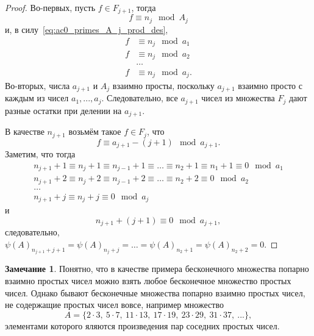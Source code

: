 \documentclass[a4paper,openbib]{article}
\theoremstyle{definition}
\newtheorem{remark}[lemma]{Замечание}
\begin{document}
\begin{proof}
	Во-первых, пусть $f \in F_{j+1}$,
	тогда
	\begin{equation}
		f \equiv n_j \mod A_j
	\end{equation}
	и, в силу~\eqref{eq:ac0_primes_A_j_prod_des},
	\begin{equation}
		\begin{array}{rl}
		f &\equiv n_j \mod a_1
		\\
		f &\equiv n_j \mod a_2
		\\
		&\dots
		\\
		f &\equiv n_j \mod a_j
		.
		\end{array}
	\end{equation}
	Во-вторых, числа $a_{j+1}$ и $A_j$ взаимно просты, поскольку $a_{j+1}$ взаимно просто с каждым из чисел $a_1,...,a_j$.
	Следовательно, все $a_{j+1}$ чисел из множества $F_j$ дают разные остатки при делении на $a_{j+1}$.
	
	В качестве $n_{j+1}$ возьмём такое $f\in F_j$, что
	\begin{equation}
		f \equiv a_{j+1} - (j+1) \mod a_{j+1}
		.
	\end{equation}
	Заметим, что тогда
	\begin{equation}
		\begin{array}{l}
			n_{j+1} + 1 \equiv n_j + 1 \equiv n_{j-1} + 1 \equiv \dots \equiv n_2 + 1 \equiv n_1 + 1 \equiv 0 \mod a_1
			\\
			n_{j+1} + 2 \equiv n_j + 2 \equiv n_{j-1} + 2 \equiv \dots \equiv n_2 + 2 \equiv 0 \mod a_2
			\\
			\dots
			\\
			n_{j+1} + j \equiv n_j + j  \equiv 0 \mod a_j
		\end{array}
	\end{equation}
	и
	\begin{equation}
		n_{j+1} + (j+1) \equiv 0 \mod a_{j+1}
		,
	\end{equation}
	следовательно, 
	$\psi(A)_{n_{j+1} + j+1} = \psi(A)_{n_{j} + j} = \dots = \psi(A)_{n_2 + 1} = \psi(A)_{n_2 + 2} = 0$.
	
	
\end{proof}

\begin{remark}
	Понятно, что в качестве примера бесконечного множества
	попарно взаимно простых чисел можно взять любое бесконечное множество простых чисел.
	Однако бывают бесконечные множества попарно взаимно простых чисел,
	не содержащие простых чисел вовсе, например множество
	\begin{equation}
		A = \{ 2\cdot 3,~5 \cdot 7,~11 \cdot 13,~17\cdot 19,~23\cdot29,~31\cdot 37,~...\},
	\end{equation}
	элементами которого яляются произведения пар соседних простых чисел.
\end{remark}
\end{document}
